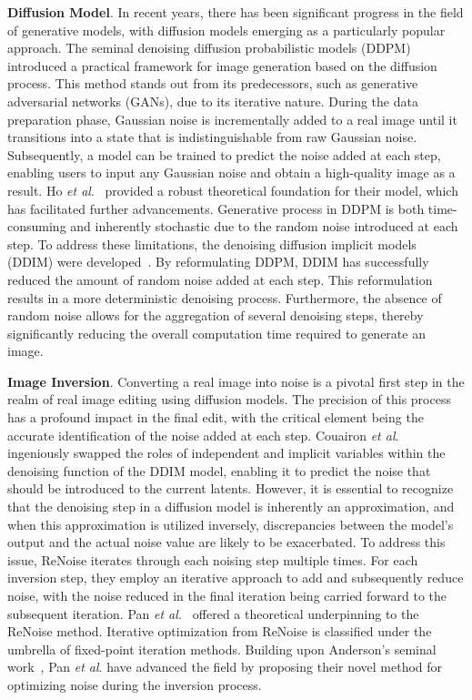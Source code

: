 \documentclass[letterpaper]{article} \usepackage{aaai25}  \usepackage{times}  \usepackage{helvet}  \usepackage{courier}  \usepackage[hyphens]{url}  \usepackage{graphicx} \urlstyle{rm} \def\UrlFont{\rm}  \usepackage{natbib}  \usepackage{caption} \frenchspacing  \setlength{\pdfpagewidth}{8.5in} \setlength{\pdfpageheight}{11in} \usepackage{algorithm}
\begin{document}
\textbf{Diffusion Model}.
In recent years, there has been significant progress in the field of generative models, with diffusion models emerging as a particularly popular approach.
The seminal denoising diffusion probabilistic models (DDPM)~\cite{ho2020denoising} introduced a practical framework for image generation based on the diffusion process.
This method stands out from its predecessors, such as generative adversarial networks (GANs), due to its iterative nature.
During the data preparation phase, Gaussian noise is incrementally added to a real image until it transitions into a state that is indistinguishable from raw Gaussian noise.
Subsequently, a model can be trained to predict the noise added at each step, enabling users to input any Gaussian noise and obtain a high-quality image as a result.
Ho \emph{et al}.~\cite{ho2020denoising} provided a robust theoretical foundation for their model, which has facilitated further advancements.
Generative process in DDPM is both time-consuming and inherently stochastic due to the random noise introduced at each step. To address these limitations, the denoising diffusion implicit models (DDIM) were developed~\cite{song2020denoising}. 
By reformulating DDPM, DDIM has successfully reduced the amount of random noise added at each step. This reformulation results in a more deterministic denoising process. Furthermore, the absence of random noise allows for the aggregation of several denoising steps, thereby significantly reducing the overall computation time required to generate an image.


\textbf{Image Inversion}.
Converting a real image into noise is a pivotal first step in the realm of real image editing using diffusion models.
The precision of this process has a profound impact in the final edit, with the critical element being the accurate identification of the noise added at each step.
Couairon \emph{et al}.~\cite{couairon2023diffedit} ingeniously swapped the roles of independent and implicit variables within the denoising function of the DDIM model, enabling it to predict the noise that should be introduced to the current latents.
However, it is essential to recognize that the denoising step in a diffusion model is inherently an approximation, and when this approximation is utilized inversely, discrepancies between the model's output and the actual noise value are likely to be exacerbated.
To address this issue, ReNoise \cite{garibi2024renoise} iterates through each noising step multiple times. For each inversion step, they employ an iterative approach to add and subsequently reduce noise, with the noise reduced in the final iteration being carried forward to the subsequent iteration.
Pan \emph{et al.}~\cite{pan2023effective} offered a theoretical underpinning to the ReNoise method. Iterative optimization from ReNoise is classified under the umbrella of fixed-point iteration methods. Building upon Anderson's seminal work~\cite{anderson1965iterative}, Pan \emph{et al}. have advanced the field by proposing their novel method for optimizing noise during the inversion process. 
\end{document}
